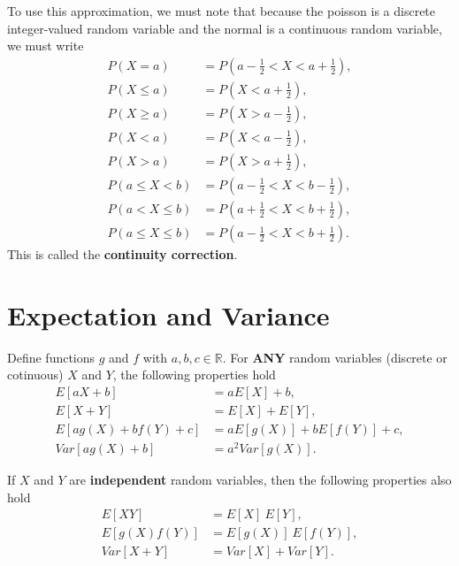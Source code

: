 \begin{note}\label{mod2:note:NormalApproxtoPois:Continuity}
	To use this approximation, we must note that because the poisson is a discrete integer-valued random variable and the normal is a continuous random variable, we must write
	\begin{align}
	P(X=a) &= P \left( a -\frac{1}{2} < X < a + \frac{1}{2} \right), \\
	P(X \leq a) &= P \left( X < a + \frac{1}{2} \right), \\
	P(X \geq a) &= P \left( X > a - \frac{1}{2} \right), \\
	P(X < a) &= P \left( X < a - \frac{1}{2} \right), \\
	P(X > a) &= P \left( X > a + \frac{1}{2} \right), \\
	P(a \leq X < b) &= P \left( a - \frac{1}{2} < X < b - \frac{1}{2} \right), \\
	P(a < X \leq  b) &= P \left( a + \frac{1}{2} < X < b + \frac{1}{2} \right), \\
	P(a  \leq  X \leq  b) &= P \left( a - \frac{1}{2} < X < b + \frac{1}{2} \right).
	\end{align}
	This is called the \textbf{continuity correction}.
\end{note}


\section{Expectation and Variance} \label{mod2:section:ExpectationVariance}

\begin{prop}

Define  functions $g$ and $f$ with $a, b, c \in \mathbb{R}$. For \textbf{ANY} random variables (discrete or cotinuous) $X$ and $Y$, the following properties hold
\begin{align}
E[aX + b] &= aE[X] + b, \\
E[X + Y] &= E[X] + E[Y], \\
E[ag(X) + bf(Y)  + c] &= aE[g(X) ]+ bE[f(Y)] + c, \\
Var[ag(X) + b] &= a^2Var[g(X)].
\end{align}

If $X$ and $Y$ are \textbf{independent} random variables, then the following properties also hold
\begin{align}
E[XY] &= E[X] \ E[Y], \\
E[g(X)f(Y)] &= E[g(X)] \ E[f(Y)], \\
Var[X + Y] &= Var[X]+ Var[Y].
\end{align}

\end{prop}


